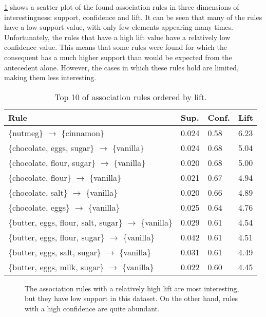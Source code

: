 \cref{fig:rules_scatter} shows a scatter plot of the found association rules in three dimensions of interestingness: support, confidence and lift.
It can be seen that many of the rules have a low support value, with only few elements appearing many times.
Unfortunately, the rules that have a high lift value have a relatively low confidence value.
This means that some rules were found for which the consequent has a much higher support than would be expected from the antecedent alone.
However, the cases in which these rules hold are limited, making them less interesting.

\begin{table}[htbp]
	\caption{Top 10 of association rules ordered by lift.}
	\label{tab:rules_top10}
	
	\centering
	\begin{tabular}{l l l l}
		\toprule
		\textbf{Rule} & \textbf{Sup.} & \textbf{Conf.} & \textbf{Lift} \\
		\midrule
		\{nutmeg\} $\rightarrow$ \{cinnamon\} & 0.024 & 0.58 & 6.23 \\
		\{chocolate, eggs, sugar\} $\rightarrow$ \{vanilla\} & 0.024 & 0.68 & 5.04 \\
		\{chocolate, flour, sugar\} $\rightarrow$ \{vanilla\} & 0.020 & 0.68 & 5.00 \\
		\{chocolate, flour\} $\rightarrow$ \{vanilla\} & 0.021 & 0.67 & 4.94 \\
		\{chocolate, salt\} $\rightarrow$ \{vanilla\} & 0.020 & 0.66 & 4.89 \\
		\{chocolate, eggs\} $\rightarrow$ \{vanilla\} & 0.025 & 0.64 & 4.76 \\
		\{butter, eggs, flour, salt, sugar\} $\rightarrow$ \{vanilla\} & 0.029 & 0.61 & 4.54 \\
		\{butter, eggs, flour, sugar\} $\rightarrow$ \{vanilla\} & 0.042 & 0.61 & 4.51 \\
		\{butter, eggs, salt, sugar\} $\rightarrow$ \{vanilla\} & 0.031 & 0.61 & 4.49 \\
		\{butter, eggs, milk, sugar\} $\rightarrow$ \{vanilla\} & 0.022 & 0.60 & 4.45 \\
		\bottomrule
	\end{tabular}
	
\end{table}

\begin{figure}[htbp]
	\centering

	
	
	\caption{The association rules with a relatively high lift are most interesting, but they have low support in this dataset. On the other hand, rules with a high confidence are quite abundant.}
	\label{fig:rules_scatter}
\end{figure}


